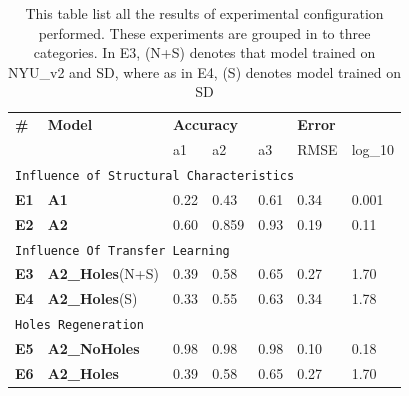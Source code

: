  
\begin{table}[h]
\begin{tabular}{p{0.05\linewidth}p{0.3\linewidth}p{0.1\linewidth}p{0.1\linewidth}p{0.08\linewidth}p{0.08\linewidth}p{0.07\linewidth}}
\hline
\textbf{\#} & \textbf{Model} & \multicolumn{3}{l}{\textbf{Accuracy}} & \multicolumn{2}{l}{\textbf{Error}} \\ \cline{3-7} 
                    &                        & a1       & a2       & a3      & RMSE         & log\_10      \\ \hline
\multicolumn{7}{l}{\texttt{Influence of Structural Characteristics}}                                            \\ \hline
\textbf{E1}                  &  \textbf{A1}  & 0.22         & 0.43          &  0.61       & 0.34            &   0.001           \\ \hline
\textbf{E2}                  & \textbf{A2}  &    0.60  & 0.859 & 0.93       &   0.19          &0.11              \\ \hline
\multicolumn{7}{l}{\texttt{Influence Of Transfer Learning}}                                                                   \\ \hline
\textbf{E3}                  & \textbf{A2\_Holes}(N+S)              & 0.39   & 0.58   & 0.65  & 0.27      & 1.70       \\ \hline
\textbf{E4}                  & \textbf{A2\_Holes}(S) & 0.33   & 0.55   & 0.63  & 0.34      & 1.78       \\ \hline
\multicolumn{7}{l}{\texttt{Holes Regeneration}}                                                       \\ \hline
\textbf{E5}                  & \textbf{A2\_NoHoles}            & 0.98   & 0.98   & 0.98  & 0.10       & 0.18        \\ \hline
\textbf{E6}                  & \textbf{A2\_Holes}              & 0.39   & 0.58   & 0.65  & 0.27      & 1.70       \\ \hline
\end{tabular}

\caption{This table list all the results of experimental configuration performed. These experiments are grouped in to three categories. In E3, (N+S) denotes that model trained on NYU\_v2 and SD, where as in E4, (S) denotes model trained on SD}
\label{table:Results_main}
\end{table}

